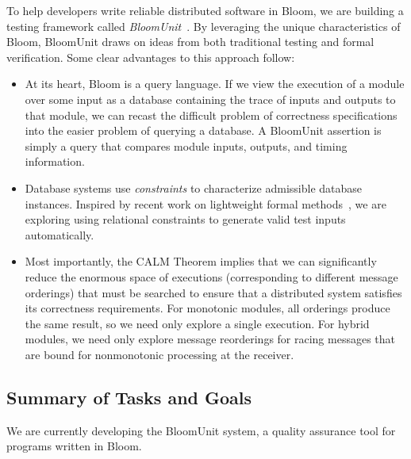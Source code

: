 To help developers write reliable distributed software in Bloom, we are building
a testing framework called \emph{BloomUnit}~\cite{Alvaro2012}. By leveraging the
unique characteristics of Bloom, BloomUnit draws on ideas from both traditional
testing and formal verification. Some clear advantages to this approach follow:

\begin{itemize}
\item
  At its heart, Bloom is a query language.  If we view the execution of a module
  over some input as a database containing the trace of inputs and outputs to
  that module, we can recast the difficult problem of correctness specifications
  into the easier problem of querying a database. A BloomUnit assertion is
  simply a query that compares module inputs, outputs, and timing information.

\item
  Database systems use \emph{constraints} to characterize admissible database
  instances.  Inspired by recent work on lightweight formal
  methods~\cite{Jackson2012}, we are exploring using relational constraints to
  generate valid test inputs automatically.

\item
  Most importantly, the CALM Theorem implies that we can significantly reduce
  the enormous space of executions (corresponding to different message
  orderings) that must be searched to ensure that a distributed system satisfies
  its correctness requirements.  For monotonic modules, all orderings produce
  the same result, so we need only explore a single execution.  For hybrid
  modules, we need only explore message reorderings for racing messages that are
  bound for nonmonotonic processing at the receiver.
\end{itemize}



\subsection{Summary of Tasks and Goals}

We are currently developing the BloomUnit system, a quality assurance tool
for programs written in Bloom.  

